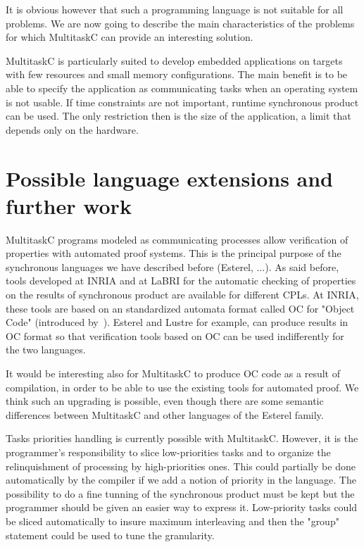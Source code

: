 \documentclass[10pt]{report}
\begin{document}
It is obvious however that such a programming language is not suitable for all problems. We are now going to describe the main 
characteristics of the problems for which MultitaskC can provide an interesting solution.

MultitaskC is particularly suited to develop embedded applications on targets with few resources and small
memory configurations. The main benefit is to be able to specify the application as communicating tasks when an operating
system is not usable. If time constraints are not important, runtime synchronous product can be used. The only restriction 
then is the size of the application, a limit that depends only on the hardware.

\section{Possible language extensions and further work}

MultitaskC programs modeled as communicating processes allow verification of properties with automated proof systems. This
is the principal purpose of the synchronous languages we have described before (Esterel, ...). As said before, 
tools developed at INRIA and at LaBRI for the automatic checking of properties on the results of synchronous
product are available for different CPLs. At INRIA, these tools are based on an standardized automata format called OC 
for "Object Code" (introduced by~\cite{Halbwachs:91}). Esterel and Lustre for example, can produce results in OC format 
so that verification tools based on OC can be used indifferently for the two languages.

It would be interesting also for MultitaskC to produce OC code as a result of compilation, in order to be able to use
the existing tools for automated proof. We think such an upgrading is possible, even though there are some semantic 
differences between MultitaskC and other languages of the Esterel family.

Tasks priorities handling is currently possible with MultitaskC. However, it is the programmer's responsibility to slice 
low-priorities tasks and to organize the relinquishment of processing by high-priorities ones. This could partially be done 
automatically by the compiler if we add a notion of priority in the language. The possibility to do a fine tunning of the 
synchronous product must be kept but the programmer should be given an easier way to express it. Low-priority tasks could be 
sliced automatically to insure maximum interleaving and then the "group" statement could be used to tune the granularity.
\end{document}
